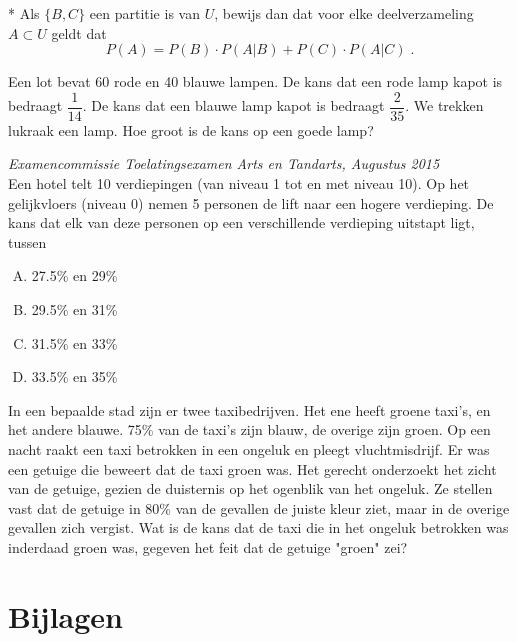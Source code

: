\documentclass[12pt,twoside]{article}
\begin{document}
\begin{oefening}*
Als $\{B,C\}$ een partitie is van $U$, bewijs dan dat voor elke deelverzameling $A\subset U$ geldt dat
$$P(A)=P(B)\cdot P(A|B)+P(C)\cdot P(A|C)\;.$$
\end{oefening}

\begin{oefening}
Een lot bevat 60 rode en 40 blauwe lampen. De kans dat een rode lamp kapot is bedraagt $\dfrac{1}{14}$. De kans dat een blauwe lamp kapot is bedraagt $\dfrac{2}{35}$. We trekken lukraak een lamp. Hoe groot is de kans op een goede lamp?
\end{oefening}

\begin{oefening}
{\scriptsize\em Examencommissie Toelatingsexamen Arts en Tandarts, Augustus 2015}\\
Een hotel telt 10 verdiepingen (van niveau 1 tot en met niveau 10). Op het gelijkvloers
(niveau 0) nemen 5 personen de lift naar een hogere verdieping. De kans dat elk van deze
personen op een verschillende verdieping uitstapt ligt, tussen
\begin{enumerate}[(A)]
  \item 27.5\% en 29\%
  \item 29.5\% en 31\%   %
  \item 31.5\% en 33\%
  \item 33.5\% en 35\%
\end{enumerate}
\end{oefening}

\begin{oefening}
In een bepaalde stad zijn er twee taxibedrijven. Het ene heeft groene taxi's, en het andere blauwe. 75\% van de taxi's zijn blauw, de overige zijn groen. Op een nacht raakt een taxi betrokken in een ongeluk en pleegt vluchtmisdrijf. Er was een getuige die beweert dat de taxi groen was. Het gerecht onderzoekt het zicht van de getuige, gezien de duisternis op het ogenblik van het ongeluk. Ze stellen vast dat de getuige in 80\% van de gevallen de juiste kleur ziet, maar in de overige gevallen zich vergist. Wat is de kans dat de taxi die in het ongeluk betrokken was inderdaad groen was, gegeven het feit dat de getuige "groen" zei?
\end{oefening}

\newpage
\appendix
\section*{Bijlagen}
\end{document}
